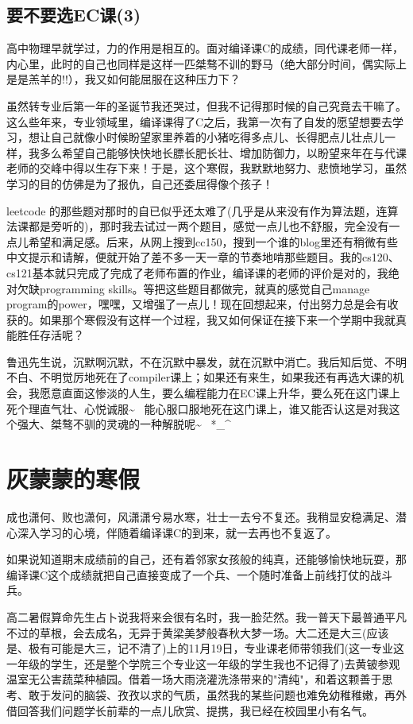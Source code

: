 \documentclass[12pt]{book}
\begin{document}
\section{要不要选EC课(3)}
\label{sec-14-3}

高中物理早就学过，力的作用是相互的。面对编译课C的成绩，同代课老师一样，内心里，此时的自己也同样是这样一匹桀骜不训的野马（绝大部分时间，偶实际上是是羔羊的!!），我又如何能屈服在这种压力下？

虽然转专业后第一年的圣诞节我还哭过，但我不记得那时候的自己究竟去干嘛了。这么些年来，专业领域里，编译课得了C之后，我第一次有了自发的愿望想要去学习，想让自己就像小时候盼望家里养着的小猪吃得多点儿、长得肥点儿壮点儿一样，我多么希望自己能够快快地长膘长肥长壮、增加防御力，以盼望来年在与代课老师的交峰中得以生存下来！于是，这个寒假，我默默地努力、悲愤地学习，虽然学习的目的仿佛是为了报仇，自己还委屈得像个孩子！

leetcode 的那些题对那时的自已似乎还太难了(几乎是从来没有作为算法题，连算法课都是旁听的)，那时我去试过一两个题目，感觉一点儿也不舒服，完全没有一点儿希望和满足感。后来，从网上搜到cc150，搜到一个谁的blog里还有稍微有些中文提示和请解，便就开始了差不多一天一章的节奏地啃那些题目。我的cs120、cs121基本就只完成了完成了老师布置的作业，编译课的老师的评价是对的，我绝对欠缺programming skills。等把这些题目都做完，就真的感觉自己manage program的power，嘿嘿，又增强了一点儿！现在回想起来，付出努力总是会有收获的。如果那个寒假没有这样一个过程，我又如何保证在接下来一个学期中我就真能胜任存活呢？

鲁迅先生说，沉默啊沉默，不在沉默中暴发，就在沉默中消亡。我后知后觉、不明不白、不明觉厉地死在了compiler课上；如果还有来生，如果我还有再选大课的机会，我愿意直面这惨淡的人生，要么编程能力在EC课上升华，要么死在这门课上死个理直气壮、心悦诚服\textasciitilde{}~  能心服口服地死在这门课上，谁又能否认这是对我这个强大、桀骜不驯的灵魂的一种解脱呢\textasciitilde{}~  *\_\^{}

\chapter{灰蒙蒙的寒假}
\label{sec-15}

成也潇何、败也潇何，风潇潇兮易水寒，壮士一去兮不复还。我稍显安稳满足、潜心深入学习的心境，伴随着编译课C的到来，就一去再也不复返了。

如果说知道期末成绩前的自己，还有着邻家女孩般的纯真，还能够愉快地玩耍，那编译课C这个成绩就把自己直接变成了一个兵、一个随时准备上前线打仗的战斗兵。

高二暑假算命先生占卜说我将来会很有名时，我一脸茫然。我一普天下最普通平凡不过的草根，会去成名，无异于黄梁美梦般春秋大梦一场。大二还是大三(应该是、极有可能是大三，记不清了)上的11月19日，专业课老师带领我们(这一专业这一年级的学生，还是整个学院三个专业这一年级的学生我也不记得了)去黄铍参观温室无公害蔬菜种植园。借着一场大雨浇灌洗涤带来的"清纯"，和着这颗善于思考、敢于发问的脑袋、孜孜以求的气质，虽然我的某些问题也难免幼稚稚嫩，再外借回答我们问题学长前辈的一点儿欣赏、提携，我已经在校园里小有名气。
\end{document}
